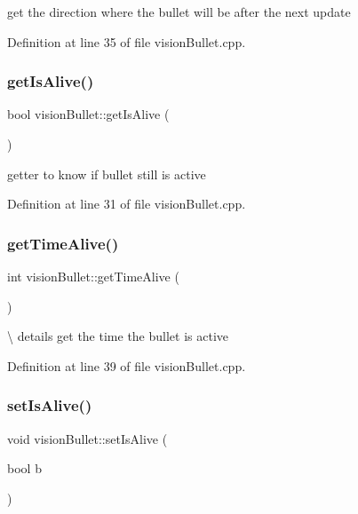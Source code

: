 get the direction where the bullet will be after the next update 

Definition at line 35 of file vision\+Bullet.\+cpp.

\mbox{\label{classvision_bullet_a01a4cf06a2403aa6dce98ecd52b23bf0}} 
\subsubsection{\texorpdfstring{get\+Is\+Alive()}{getIsAlive()}}
{\footnotesize\ttfamily bool vision\+Bullet\+::get\+Is\+Alive (\begin{DoxyParamCaption}{ }\end{DoxyParamCaption})}

getter to know if bullet still is active 

Definition at line 31 of file vision\+Bullet.\+cpp.

\mbox{\label{classvision_bullet_a152e9b57ee511a97c9050dbf8ed84b90}} 
\subsubsection{\texorpdfstring{get\+Time\+Alive()}{getTimeAlive()}}
{\footnotesize\ttfamily int vision\+Bullet\+::get\+Time\+Alive (\begin{DoxyParamCaption}{ }\end{DoxyParamCaption})}

\textbackslash{} details get the time the bullet is active 

Definition at line 39 of file vision\+Bullet.\+cpp.

\mbox{\label{classvision_bullet_a67881b6eb8c31e128ff1ecc5ed110855}} 
\subsubsection{\texorpdfstring{set\+Is\+Alive()}{setIsAlive()}}
{\footnotesize\ttfamily void vision\+Bullet\+::set\+Is\+Alive (\begin{DoxyParamCaption}\item[{bool}]{b }\end{DoxyParamCaption})}

